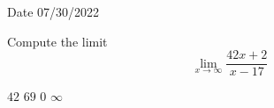 \documentclass[answers]{exam}
\begin{document}
Date 07/30/2022
\begin{questions}
    \checkboxchar{$\Box$}
    \checkedchar{$\checkmark$}
    \question Compute the limit
    $$
        \lim_{x\to\infty} \frac{42 x +2}{x-17}
    $$

    \begin{oneparcheckboxes}
        \CorrectChoice $42$
        \choice $69$
        \choice $0$
        \choice $\infty$
    \end{oneparcheckboxes}

\end{questions}
\end{document}
